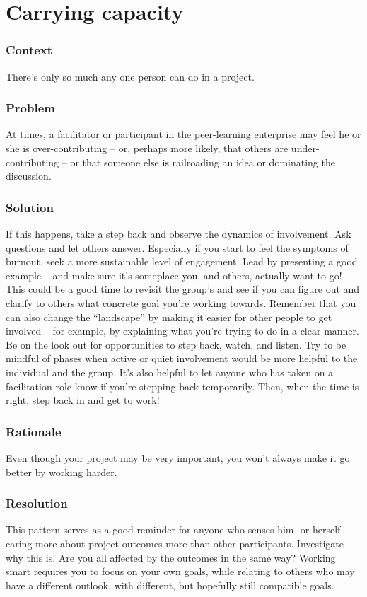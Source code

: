 \section{Carrying capacity}\label{sec:Carrying_capacity}
\subsubsection*{Context} There's only so much any one person can do in a project.

\subsubsection*{Problem} At times, a facilitator or participant in the
peer-learning enterprise may feel he or she is over-contributing -- or,
perhaps more likely, that others are under-contributing -- or that
someone else is railroading an idea or dominating the discussion.

\subsubsection*{Solution} If this happens, take a step back and observe the
dynamics of involvement. Ask questions and let others
answer. Especially if you start to feel the symptoms of burnout, seek
a more sustainable level of engagement.  Lead by presenting a good
example -- and make sure it's someplace you, and others, actually want
to go!  This could be a good time to revisit the group's
 and see if you can figure out and clarify to
others what concrete goal you're working towards. Remember that you
can also change the ``landscape'' by making it easier for other people
to get involved -- for example, by explaining what you're trying to do
in a clear manner.  Be on the look out for opportunities to step back,
watch, and listen.  Try to be mindful of phases when active or quiet
involvement would be more helpful to the individual and the group.
It's also helpful to let anyone who has taken on a facilitation role
know if you're stepping back temporarily.  Then, when the time is
right, step back in and get to work!

\subsubsection*{Rationale} Even though your project may be very important, you
won't always make it go better by working harder.


\subsubsection*{Resolution}
This pattern serves as a good reminder for anyone who senses him- or
herself caring more about project outcomes more than other
participants.  Investigate why this is.  Are you all affected by the
outcomes in the same way?  Working smart requires you to focus on your
own goals, while relating to others who may have a different outlook,
with different, but hopefully still compatible goals.

